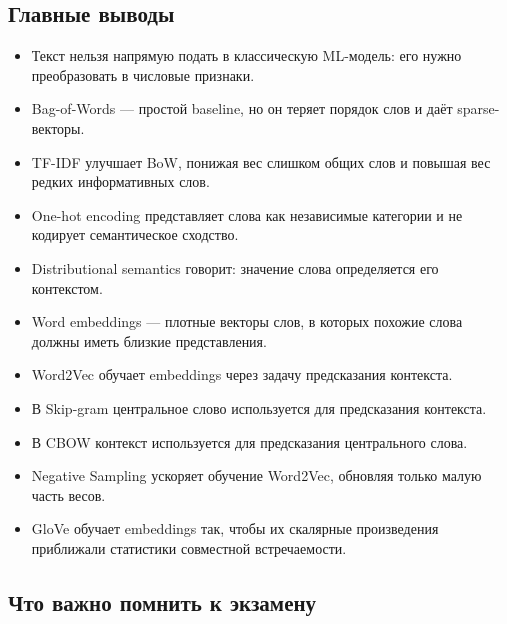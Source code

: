 \documentclass[a4paper,12pt]{article}
\begin{document}
\subsection{Главные выводы}

\begin{itemize}
    \item Текст нельзя напрямую подать в классическую ML-модель: его нужно преобразовать в числовые признаки.
    \item Bag-of-Words --- простой baseline, но он теряет порядок слов и даёт sparse-векторы.
    \item TF-IDF улучшает BoW, понижая вес слишком общих слов и повышая вес редких информативных слов.
    \item One-hot encoding представляет слова как независимые категории и не кодирует семантическое сходство.
    \item Distributional semantics говорит: значение слова определяется его контекстом.
    \item Word embeddings --- плотные векторы слов, в которых похожие слова должны иметь близкие представления.
    \item Word2Vec обучает embeddings через задачу предсказания контекста.
    \item В Skip-gram центральное слово используется для предсказания контекста.
    \item В CBOW контекст используется для предсказания центрального слова.
    \item Negative Sampling ускоряет обучение Word2Vec, обновляя только малую часть весов.
    \item GloVe обучает embeddings так, чтобы их скалярные произведения приближали статистики совместной встречаемости.
\end{itemize}

\subsection{Что важно помнить к экзамену}
\end{document}
